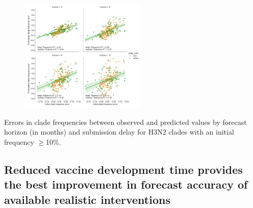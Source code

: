 \documentclass[9pt,lineno]{elife}
\begin{document}
\begin{figure}[htb]
%
{\includegraphics[width=6cm]{figures/h3n2_forecast_frequency_errors_by_initial_frequency_errors_delay_and_horizon}}\label{figsupp:h3n2_forecast_clade_frequency_errors_by_initial_frequency_errors}
%
\label{figdata:h3n2_clade_frequencies}
\label{figsrccode:forecast_clade_frequency_errors}
\end{figure}

\begin{table}[htb]
  \begin{center}
    
    \caption{Errors in clade frequencies between observed and predicted values by forecast horizon (in months) and submission delay for H3N2 clades with an initial frequency $\geq$10\%.}
    \label{tab:h3n2_forecast_clade_frequency_errors}
  \end{center}
\end{table}

\subsection{Reduced vaccine development time provides the best improvement in forecast accuracy of available realistic interventions}
\end{document}
